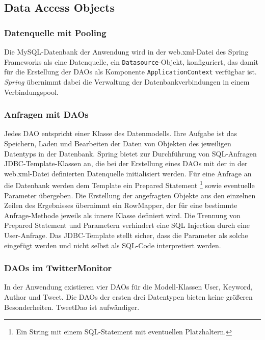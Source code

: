 \subsection{Data Access Objects} 
\subsubsection*{Datenquelle mit Pooling}
Die MySQL-Datenbank der Anwendung wird in der web.xml-Datei des Spring Frameworks als eine 
Datenquelle, ein \texttt{Datasource}-Objekt, konfiguriert, das damit für die Erstellung der DAOs als 
Komponente \texttt{ApplicationContext} verfügbar ist. \textit{Spring} übernimmt dabei die Verwaltung der 
Datenbankverbindungen in einem Verbindungspool.
%
\subsubsection*{Anfragen mit DAOs}
Jedes DAO entspricht einer Klasse des Datenmodells. Ihre Aufgabe ist das Speichern, Laden und 
Bearbeiten der Daten von Objekten des jeweiligen Datentyps in der Datenbank. Spring bietet zur 
Durchführung von SQL-Anfragen JDBC-Template-Klassen an, die bei der Erstellung eines DAOs mit der in 
der web.xml-Datei definierten Datenquelle initialisiert werden. Für eine Anfrage an die Datenbank 
werden dem Template ein Prepared Statement \footnote{Ein String mit einem SQL-Statement mit eventuellen Platzhaltern.} sowie eventuelle Parameter übergeben. Die Erstellung der 
angefragten Objekte aus den einzelnen Zeilen des Ergebnisses übernimmt ein RowMapper, der für eine 
bestimmte Anfrage-Methode jeweils als innere Klasse definiert wird. Die Trennung von Prepared 
Statement und Parametern verhindert eine SQL Injection durch eine User-Anfrage. Das JDBC-Template 
stellt sicher, dass die Parameter als solche eingefügt werden und nicht selbst als SQL-Code 
interpretiert werden.

\subsubsection*{DAOs im TwitterMonitor}
In der Anwendung existieren vier DAOs für die Modell-Klassen User, Keyword, Author und Tweet. Die 
DAOs der ersten drei Datentypen bieten keine größeren Besonderheiten. TweetDao ist aufwändiger.

